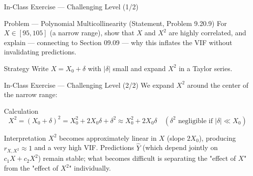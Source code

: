 \documentclass[10pt, aspectratio=169]{beamer}
\begin{document}
\begin{frame}{In-Class Exercise --- Challenging Level (1/2)}
  \footnotesize
  \begin{block}{Problem --- Polynomial Multicollinearity (Statement, Problem 9.20.9)}
    For $X\in[95,105]$ (a narrow range), show that $X$ and $X^2$ are highly correlated, and explain --- connecting to Section 09.09 --- why this inflates the VIF without invalidating predictions.
  \end{block}

  \vspace{0.1cm}
  \pause
  \begin{alertblock}{Strategy}
    Write $X=X_0+\delta$ with $|\delta|$ small and expand $X^2$ in a Taylor series.
  \end{alertblock}
\end{frame}

\begin{frame}{In-Class Exercise --- Challenging Level (2/2)}
  \scriptsize
  We expand $X^2$ around the center of the narrow range: \pause

  \vspace{0.05cm}
  \begin{block}{Calculation}
    \scriptsize
    $$X^2=(X_0+\delta)^2=X_0^2+2X_0\delta+\delta^2\approx X_0^2+2X_0\delta \quad (\delta^2 \text{ negligible if } |\delta|\ll X_0)$$
  \end{block}

  \vspace{0.05cm}
  \pause
  \begin{alertblock}{Interpretation}
    $X^2$ becomes approximately linear in $X$ (slope $2X_0$), producing $r_{X,X^2}\approx1$ and a very high VIF. Predictions $\hat Y$ (which depend jointly on $c_1X+c_2X^2$) remain stable; what becomes difficult is separating the "effect of $X$" from the "effect of $X^2$" individually.
  \end{alertblock}
\end{frame}
\end{document}
